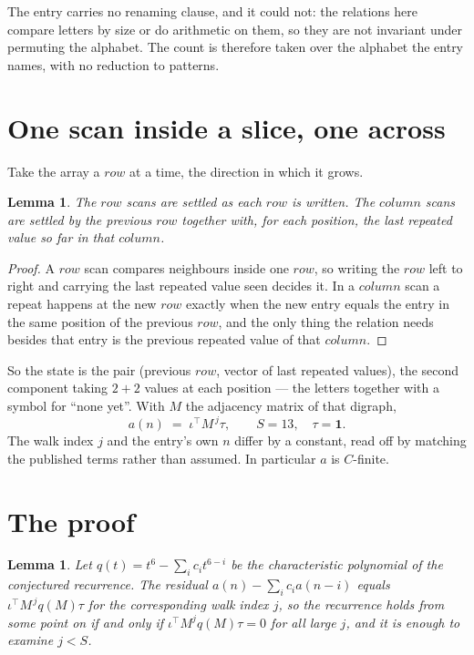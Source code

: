 \documentclass[11pt,a4paper]{article}
\theoremstyle{plain}
\newtheorem{lemma}[theorem]{Lemma}
\theoremstyle{definition}
\begin{document}
The entry carries no renaming clause, and it could not: the relations here compare letters by
size or do arithmetic on them, so they are not invariant under permuting the alphabet. The
count is therefore taken over the alphabet the entry names, with no reduction to patterns.

\section{One scan inside a slice, one across}

Take the array a $row$ at a time, the direction in which it grows.

\begin{lemma}\label{lem:state}
The $row$ scans are settled as each $row$ is written. The $column$ scans are
settled by the previous $row$ together with, for each position, the last repeated value
so far in that $column$.
\end{lemma}

\begin{proof}
A $row$ scan compares neighbours inside one $row$, so writing the
$row$ left to right and carrying the last repeated value seen decides it. In a
$column$ scan a repeat happens at the new $row$ exactly when the new entry equals the
entry in the same position of the previous $row$, and the only thing the relation needs
besides that entry is the previous repeated value of that $column$.
\end{proof}

So the state is the pair (previous $row$, vector of last repeated values), the second
component taking $2+2$ values at each position --- the letters together with a symbol for
``none yet''. With $M$ the adjacency matrix of that digraph,
\[
a(n)\;=\;\iota^{\!\top}M^{\,j}\tau ,\qquad S=13,\quad\tau=\mathbf{1} .
\]
The walk index $j$ and the entry's own $n$ differ by a constant, read off by matching the
published terms rather than assumed. In particular $a$ is $C$-finite.

\section{The proof}

\begin{lemma}\label{lem:crit}
Let $q(t)=t^{6}-\sum_i c_it^{6-i}$ be the characteristic polynomial of the
conjectured recurrence. The residual $a(n)-\sum_ic_ia(n-i)$ equals
$\iota^{\!\top}M^{\,j}q(M)\tau$ for the corresponding walk index $j$, so the recurrence
holds from some point on if and only if $\iota^{\!\top}M^{j}q(M)\tau=0$ for all large $j$,
and it is enough to examine $j<S$.
\end{lemma}
\end{document}
